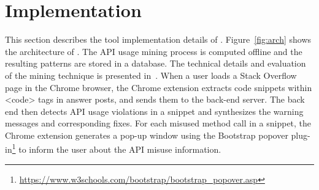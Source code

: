 \section{Implementation}
\label{sec:implementation}

This section describes the tool implementation details of {\tool}. Figure~\ref{fig:arch} shows the architecture of {\tool}. The API usage mining process is computed offline and the resulting patterns are stored in a database. The technical details and evaluation of the mining technique is presented in~\cite{zhang2018code}. When a user loads a Stack Overflow page in the Chrome browser, the Chrome extension extracts code snippets within {\ttt <code>} tags in answer posts, and sends them to the back-end server. The back end then detects API usage violations in a snippet and synthesizes the warning messages and corresponding fixes. For each misused method call in a snippet, the Chrome extension generates a pop-up window using the Bootstrap popover plug-in\footnote{\url{https://www.w3schools.com/bootstrap/bootstrap_popover.asp}} to inform the user about the API misuse information.


